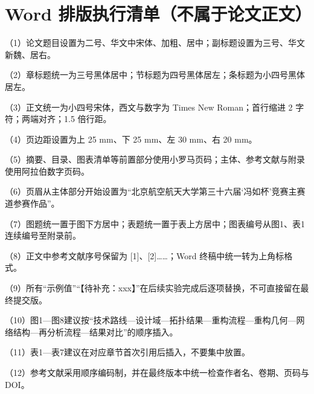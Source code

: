 \documentclass{FRB-style}
\begin{document}
\section*{Word 排版执行清单（不属于论文正文）}
{}

（1）论文题目设置为二号、华文中宋体、加粗、居中；副标题设置为三号、华文新魏、居右。

（2）章标题统一为三号黑体居中；节标题为四号黑体居左；条标题为小四号黑体居左。

（3）正文统一为小四号宋体，西文与数字为 Times New Roman；首行缩进 2 字符；两端对齐；1.5 倍行距。

（4）页边距设置为上 25 mm、下 25 mm、左 30 mm、右 20 mm。

（5）摘要、目录、图表清单等前置部分使用小罗马页码；主体、参考文献与附录使用阿拉伯数字页码。

（6）页眉从主体部分开始设置为“北京航空航天大学第三十六届‘冯如杯’竞赛主赛道参赛作品”。

（7）图题统一置于图下方居中；表题统一置于表上方居中；图表编号从图1、表1连续编号至附录前。

（8）正文中参考文献序号保留为 [1]、[2]……；Word 终稿中统一转为上角标格式。

（9）所有“示例值”“【待补充：xxx】”在后续实验完成后逐项替换，不可直接留在最终提交版。

（10）图1—图8建议按“技术路线—设计域—拓扑结果—重构流程—重构几何—网络结构—再分析流程—结果对比”的顺序插入。

（11）表1—表7建议在对应章节首次引用后插入，不要集中放置。

（12）参考文献采用顺序编码制，并在最终版本中统一检查作者名、卷期、页码与 DOI。
\end{document}

